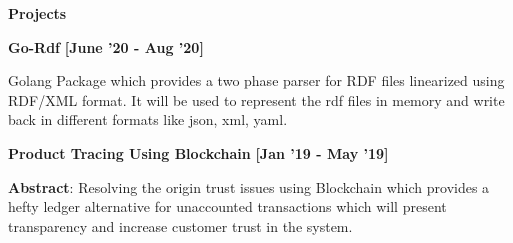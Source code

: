 \colorbox{titleColor}{\parbox{6.7in}{\textbf{Projects}}}
\begin{itemize*}
    \setlength{\itemsep}{1pt}

    \item \textbf{Go-Rdf} \hfill{\small{{\textbf{[June '20 - Aug '20]}}}}
    \begin{itemize*}
        \setlength{\itemsep}{.00pt}
        \item Golang Package which provides a two phase parser for RDF files linearized using RDF/XML format. It will be used to represent the rdf files in memory and write back in different formats like json, xml, yaml.
    \end{itemize*}


    \item \textbf{Product Tracing Using Blockchain} \hfill{\small{{\textbf{[Jan '19 - May '19]}}}}
    \begin{itemize*}
        \setlength{\itemsep}{.00pt}
        \item \textbf{Abstract}: Resolving the origin trust issues using Blockchain which provides a hefty ledger alternative for unaccounted transactions which will present transparency and increase customer trust in the system.
    \end{itemize*}







\end{itemize*}
